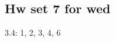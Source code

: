 \documentclass{amsart}
\numberwithin{equation}{section}
\theoremstyle{definition}
\theoremstyle{remark}
\begin{document}
\subsection*{Hw set 7 for wed}
3.4: 1, 2, 3, 4, 6
\end{document}
